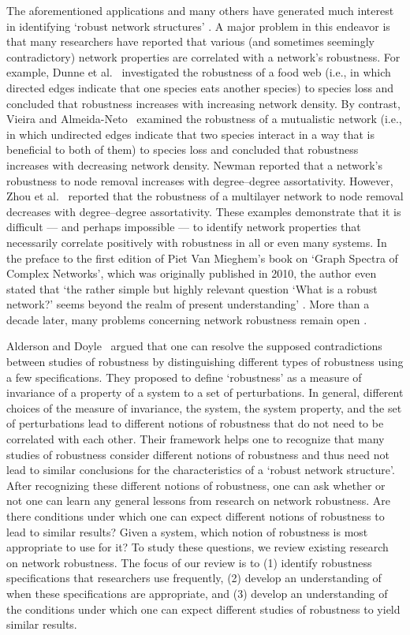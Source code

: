 \documentclass{comnet-mod}
\begin{document}
The aforementioned applications and many others have generated much interest in identifying `robust network structures' \cite{VanMieghem2005, Herrmann2011, Peixoto2012, Zeng2012}. A major problem in this endeavor is that many researchers have reported that various (and sometimes seemingly contradictory) network properties are correlated with a network's robustness. For example, Dunne et al.~\cite{Dunne2002} investigated the robustness of a food web (i.e., in which directed edges indicate that one species eats another species) to species loss and concluded that robustness increases with increasing network density. By contrast, Vieira and Almeida-Neto~\cite{Vieira2015} examined the robustness of a mutualistic network (i.e., in which undirected edges indicate that two species interact in a way that is beneficial to both of them) to species loss and concluded that robustness increases with decreasing network density. Newman \cite{Newman2002} reported that a network's robustness to node removal increases with degree--degree assortativity. However, Zhou et al.~\cite{Zhou2012} reported that the robustness of a multilayer network to node removal decreases with degree--degree assortativity. These examples demonstrate that it is difficult --- and perhaps impossible --- to identify network properties that necessarily correlate positively with robustness in all or even many systems. In the preface to the first edition of Piet Van Mieghem's book on `Graph Spectra of Complex Networks', which was originally published in 2010, the author even stated that `the rather simple but highly relevant question `What is a robust network?' seems beyond the realm of present understanding' \cite[p.\,xiii]{VanMieghem2023}. More than a decade later, many problems concerning network robustness remain open \cite{pirani2022}.


Alderson and Doyle~\cite{Alderson2010} argued that one can resolve the supposed contradictions between studies of robustness by distinguishing different types of robustness using a few specifications. They proposed to define `robustness' as a measure of invariance of a property of a system to a set of perturbations. In general, different choices of the measure of invariance, the system, the system property, and the set of perturbations lead to different notions of robustness that do not need to be correlated with each other. Their framework helps one to recognize that many studies of robustness consider different notions of robustness and thus need not lead to similar conclusions for the characteristics of a `robust network structure'. After recognizing these different notions of robustness, one can ask whether or not one can learn any general lessons from research on network robustness. Are there conditions under which one can expect different notions of robustness to lead to similar results? Given a system, which notion of robustness is most appropriate to use for it? To study these questions, we review existing research on network robustness. The focus of our review is to (1) identify robustness specifications that researchers use frequently, (2) develop an understanding of when these specifications are appropriate, and (3) develop an understanding of the conditions under which one can expect different studies of robustness to yield similar results.
\end{document}

